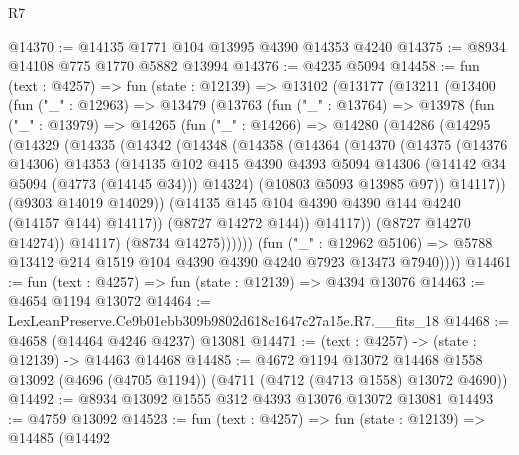 \begin{lexlean}{R7}
\begin{coremodule}
@14370 := @14135 @1771 @104 @13995 @4390 @14353 @4240
@14375 := @8934 @14108 @775 @1770 @5882 @13994
@14376 := @4235 @5094
@14458 := fun (text : @4257) =>
  fun (state : @12139) =>
  @13102
    (@13177
      (@13211
        (@13400
          (fun ("_" : @12963) =>
          @13479
            (@13763
              (fun ("_" : @13764) =>
              @13978
                (fun ("_" : @13979) =>
                @14265
                  (fun ("_" : @14266) =>
                  @14280
                    (@14286
                      (@14295
                        (@14329
                          (@14335
                            (@14342
                              (@14348
                                (@14358
                                  (@14364
                                    (@14370
                                      (@14375
                                        (@14376 @14306)
                                        @14353
                                        (@14135
                                          @102
                                          @415
                                          @4390
                                          @4393
                                          @5094
                                          @14306
                                          (@14142 @34 @5094 (@4773 (@14145 @34)))
                                          @14324)
                                        (@10803 @5093 @13985 @97))
                                      @14117))
                                  (@9303 @14019 @14029))
                                (@14135 @145 @104 @4390 @4390 @144 @4240 (@14157 @144) @14117))
                              (@8727 @14272 @144))
                            @14117))
                        (@8727 @14270 @14274))
                      @14117)
                    (@8734 @14275))))))
          (fun ("_" : @12962 @5106) =>
          @5788 @13412 @214 @1519 @104 @4390 @4390 @4240 @7923 @13473 @7940))))
@14461 := fun (text : @4257) => fun (state : @12139) => @4394 @13076
@14463 := @4654 @1194 @13072
@14464 := LexLeanPreserve.Ce9b01ebb309b9802d618c1647c27a15e.R7.__fits_18
@14468 := @4658 (@14464 @4246 @4237) @13081
@14471 := (text : @4257) -> (state : @12139) -> @14463 @14468
@14485 := @4672
    @1194
    @13072
    @14468
    @1558
    @13092
    (@4696 (@4705 @1194))
    (@4711 (@4712 (@4713 @1558) @13072 @4690))
@14492 := @8934 @13092 @1555 @312 @4393 @13076 @13072 @13081
@14493 := @4759 @13092
@14523 := fun (text : @4257) =>
  fun (state : @12139) =>
  @14485
    (@14492

\end{coremodule}
\end{lexlean}
